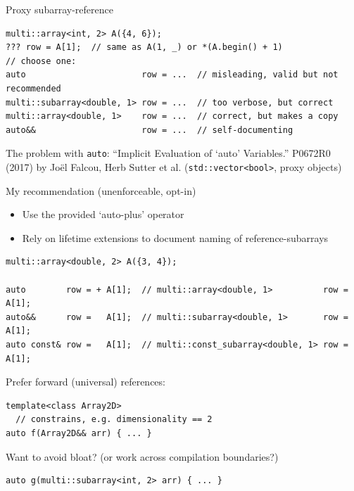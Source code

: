 \documentclass[t,aspectratio=169,handout]{beamer}
\begin{document}
\begin{frame}[fragile,label=basic2]{Proxy subarray-reference}
\begin{center}

\end{center}
\begin{lstlisting}
multi::array<int, 2> A({4, 6});
??? row = A[1];  // same as A(1, _) or *(A.begin() + 1)
// choose one:
auto                       row = ...  // misleading, valid but not recommended
multi::subarray<double, 1> row = ...  // too verbose, but correct
multi::array<double, 1>    row = ...  // correct, but makes a copy
auto&&                     row = ...  // self-documenting
\end{lstlisting}

\begin{alertblock}{The problem with \texttt{auto}: ``Implicit Evaluation of `auto' Variables.''}
P0672R0 (2017) by Jo\"el Falcou, Herb Sutter et al.
(\texttt{std::vector<bool>}, proxy objects)
\end{alertblock}

\end{frame}

\begin{frame}[fragile,label=basic3]{My recommendation (unenforceable, opt-in)}
\begin{itemize}
  \item Use the provided `auto-plus' operator
  \item Rely on lifetime extensions  to document naming of reference-subarrays
\end{itemize}
\begin{lstlisting}
multi::array<double, 2> A({3, 4});

auto        row = + A[1];  // multi::array<double, 1>          row = A[1];
auto&&      row =   A[1];  // multi::subarray<double, 1>       row = A[1];
auto const& row =   A[1];  // multi::const_subarray<double, 1> row = A[1];
\end{lstlisting}

Prefer forward (universal) references:
\begin{lstlisting}
template<class Array2D>
  // constrains, e.g. dimensionality == 2
auto f(Array2D&& arr) { ... }
\end{lstlisting}

Want to avoid bloat? (or work across compilation boundaries?)
\begin{lstlisting}
auto g(multi::subarray<int, 2> arr) { ... }
\end{lstlisting}
\end{frame}
\end{document}
